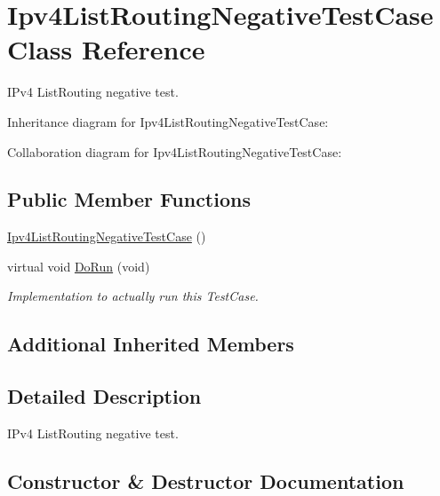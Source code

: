 \hypertarget{classIpv4ListRoutingNegativeTestCase}{}\section{Ipv4\+List\+Routing\+Negative\+Test\+Case Class Reference}
\label{classIpv4ListRoutingNegativeTestCase}


I\+Pv4 List\+Routing negative test.  




Inheritance diagram for Ipv4\+List\+Routing\+Negative\+Test\+Case\+:


Collaboration diagram for Ipv4\+List\+Routing\+Negative\+Test\+Case\+:
\subsection*{Public Member Functions}
\begin{DoxyCompactItemize}
\item 
\hyperlink{classIpv4ListRoutingNegativeTestCase_af55b85fcd49e4eddaefcb1dcb8b4506c}{Ipv4\+List\+Routing\+Negative\+Test\+Case} ()
\item 
virtual void \hyperlink{classIpv4ListRoutingNegativeTestCase_af732097dd5ad32092ec230c5e7c6f689}{Do\+Run} (void)
\begin{DoxyCompactList}\small\item\em Implementation to actually run this Test\+Case. \end{DoxyCompactList}\end{DoxyCompactItemize}
\subsection*{Additional Inherited Members}


\subsection{Detailed Description}
I\+Pv4 List\+Routing negative test. 

\subsection{Constructor \& Destructor Documentation}
